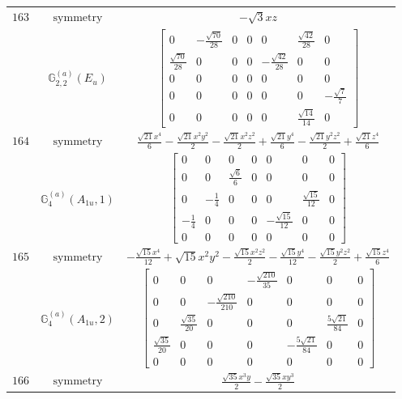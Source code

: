 \documentclass[fleqn,8pt,landscape]{jsarticle}
\begin{document}
\begin{longtable}{ccc}
$ 163 $ & $ \text{symmetry} $ & $ - \sqrt{3} x z $ \\
$  $ & $ \mathbb{G}_{2,2}^{(a)}(E_{u}) $ & $ \begin{bmatrix} 0 & - \frac{\sqrt{70}}{28} & 0 & 0 & 0 & \frac{\sqrt{42}}{28} & 0 \\ \frac{\sqrt{70}}{28} & 0 & 0 & 0 & - \frac{\sqrt{42}}{28} & 0 & 0 \\ 0 & 0 & 0 & 0 & 0 & 0 & 0 \\ 0 & 0 & 0 & 0 & 0 & 0 & - \frac{\sqrt{7}}{7} \\ 0 & 0 & 0 & 0 & 0 & \frac{\sqrt{14}}{14} & 0 \end{bmatrix} $ \\ \hline
$ 164 $ & $ \text{symmetry} $ & $ \frac{\sqrt{21} x^{4}}{6} - \frac{\sqrt{21} x^{2} y^{2}}{2} - \frac{\sqrt{21} x^{2} z^{2}}{2} + \frac{\sqrt{21} y^{4}}{6} - \frac{\sqrt{21} y^{2} z^{2}}{2} + \frac{\sqrt{21} z^{4}}{6} $ \\
$  $ & $ \mathbb{G}_{4}^{(a)}(A_{1u},1) $ & $ \begin{bmatrix} 0 & 0 & 0 & 0 & 0 & 0 & 0 \\ 0 & 0 & \frac{\sqrt{6}}{6} & 0 & 0 & 0 & 0 \\ 0 & - \frac{1}{4} & 0 & 0 & 0 & \frac{\sqrt{15}}{12} & 0 \\ - \frac{1}{4} & 0 & 0 & 0 & - \frac{\sqrt{15}}{12} & 0 & 0 \\ 0 & 0 & 0 & 0 & 0 & 0 & 0 \end{bmatrix} $ \\ \hline
$ 165 $ & $ \text{symmetry} $ & $ - \frac{\sqrt{15} x^{4}}{12} + \sqrt{15} x^{2} y^{2} - \frac{\sqrt{15} x^{2} z^{2}}{2} - \frac{\sqrt{15} y^{4}}{12} - \frac{\sqrt{15} y^{2} z^{2}}{2} + \frac{\sqrt{15} z^{4}}{6} $ \\
$  $ & $ \mathbb{G}_{4}^{(a)}(A_{1u},2) $ & $ \begin{bmatrix} 0 & 0 & 0 & - \frac{\sqrt{210}}{35} & 0 & 0 & 0 \\ 0 & 0 & - \frac{\sqrt{210}}{210} & 0 & 0 & 0 & 0 \\ 0 & \frac{\sqrt{35}}{20} & 0 & 0 & 0 & \frac{5 \sqrt{21}}{84} & 0 \\ \frac{\sqrt{35}}{20} & 0 & 0 & 0 & - \frac{5 \sqrt{21}}{84} & 0 & 0 \\ 0 & 0 & 0 & 0 & 0 & 0 & 0 \end{bmatrix} $ \\ \hline
$ 166 $ & $ \text{symmetry} $ & $ \frac{\sqrt{35} x^{3} y}{2} - \frac{\sqrt{35} x y^{3}}{2} $ \\

\end{longtable}
\end{document}
